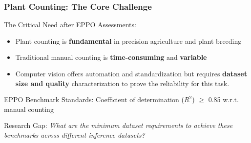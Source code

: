 \documentclass[aspectratio=43]{beamer}
\begin{document}
\begin{frame}
    \frametitle{Plant Counting: The Core Challenge}
    
    \begin{block}{The Critical Need after EPPO Assessments:}
        \begin{itemize}
            \item Plant counting is \textbf{fundamental} in precision agriculture and plant breeding
            \item Traditional manual counting is \textbf{time-consuming} and \textbf{variable}
            \item Computer vision offers automation and standardization but requires \textbf{dataset size and quality} characterization to prove the reliability for this task.
        \end{itemize}
    \end{block}
    
    \begin{exampleblock}{EPPO Benchmark Standards:}
        Coefficient of determination ($R^2$) $\geq$ 0.85 w.r.t. manual counting
    \end{exampleblock}
    
    \begin{alertblock}{Research Gap:}
        \textit{What are the minimum dataset requirements to achieve these benchmarks across different inference datasets?}
    \end{alertblock}
\end{frame}
\end{document}
